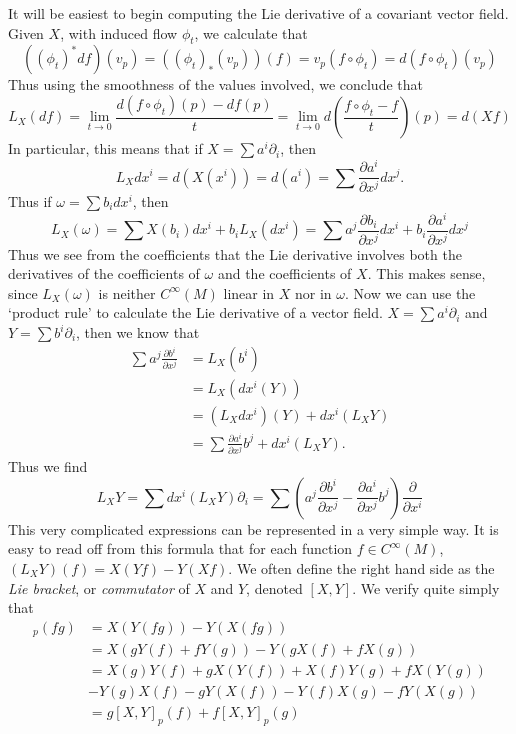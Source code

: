 It will be easiest to begin computing the Lie derivative of a covariant vector field. Given $X$, with induced flow $\phi_t$, we calculate that
%
\[ ((\phi_t)^*df)(v_p) = ((\phi_t)_*(v_p))(f) = v_p(f \circ \phi_t) = d(f \circ \phi_t)(v_p) \]
%
Thus using the smoothness of the values involved, we conclude that
%
\[ L_X(df) = \lim_{t \to 0} \frac{d(f \circ \phi_t)(p) - df(p)}{t} = \lim_{t \to 0} d \left( \frac{f \circ \phi_t - f}{t} \right)(p) = d(Xf) \]
%
In particular, this means that if $X = \sum a^i \partial_i$, then
%
\[ L_X dx^i = d(X(x^i)) = d(a^i) = \sum \frac{\partial a^i}{\partial x^j} dx^j. \]
%
Thus if $\omega = \sum b_i dx^i$, then
%
\[ L_X(\omega) = \sum X(b_i) dx^i + b_i L_X(dx^i) = \sum a^j \frac{\partial b_i}{\partial x^j} dx^i + b_i \frac{\partial a^i}{\partial x^j} dx^j \]
%
Thus we see from the coefficients that the Lie derivative involves both the derivatives of the coefficients of $\omega$ and the coefficients of $X$. This makes sense, since $L_X(\omega)$ is neither $C^\infty(M)$ linear in $X$ nor in $\omega$. Now we can use the `product rule' to calculate the Lie derivative of a vector field. $X = \sum a^i \partial_i$ and $Y = \sum b^i \partial_i$, then we know that
%
\begin{align*}
    \sum a^j \frac{\partial b^i}{\partial x^j} &= L_X(b^i) \\
    &= L_X(dx^i(Y))\\
    &= (L_X dx^i)(Y) + dx^i(L_X Y)\\
    &= \sum \frac{\partial a^i}{\partial x^j} b^j + dx^i(L_X Y).
\end{align*}
%
Thus we find
%
\[ L_X Y = \sum dx^i(L_X Y) \partial_i = \sum \left( a^j \frac{\partial b^i}{\partial x^j} - \frac{\partial a^i}{\partial x^j} b^j \right) \frac{\partial}{\partial x^i} \]
%
This very complicated expressions can be represented in a very simple way. It is easy to read off from this formula that for each function $f \in C^\infty(M)$, $(L_X Y)(f) = X(Yf) - Y(Xf)$. We often define the right hand side as the \emph{Lie bracket}, or \emph{commutator} of $X$ and $Y$, denoted $[X,Y]$. We verify quite simply that
%
\begin{align*}
    [X,Y]_p(fg) &= X(Y(fg)) - Y(X(fg))\\
    &= X(gY(f) + fY(g)) - Y(gX(f) + fX(g))\\
    &= X(g)Y(f) + gX(Y(f)) + X(f)Y(g) + fX(Y(g))\\
    &- Y(g)X(f) - gY(X(f)) - Y(f)X(g) - fY(X(g))\\
    &= g [X,Y]_p(f) + f [X,Y]_p(g)
\end{align*}
